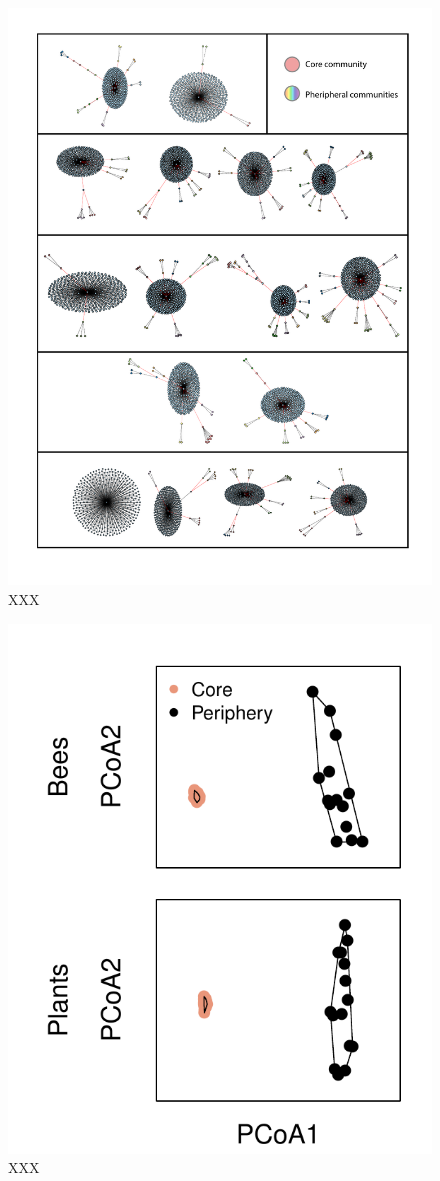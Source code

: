\documentclass[12pt]{article}
\begin{document}
\begin{figure}
  \centering
  \includegraphics[width=.8\textwidth]{../analysis/changePoint/plotting/communities.pdf}
  \caption{XXX}
  \label{fig:communities}
\end{figure}
\clearpage

\begin{figure}
  \centering
  \includegraphics[width=.7\textwidth]{../analysis/changePoint/plotting/figures/pcoa/pcoa.pdf}
  \caption{XXX}
  \label{fig:pcoa}
\end{figure}
\clearpage
\end{document}
